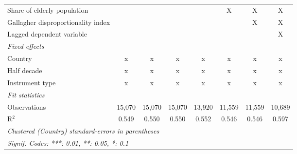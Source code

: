 \begin{tabular}{lccccccc}
   Share of elderly population                                        &                &               &               &               & X              & X              & X\\  
   Gallagher disproportionality index                                 &                &               &               &               &                & X              & X\\  
   Lagged dependent variable                                          &                &               &               &               &                &                & X\\  
   \emph{Fixed effects}\\
   Country                                                            & x              & x             & x             & x             & x              & x              & x\\  
   Half decade                                                        & x              & x             & x             & x             & x              & x              & x\\  
   Instrument type                                                    & x              & x             & x             & x             & x              & x              & x\\  
   \midrule \emph{Fit statistics}\\
   Observations                                                       & 15,070         & 15,070        & 15,070        & 13,920        & 11,559         & 11,559         & 10,689\\  
   R$^2$                                                              & 0.549          & 0.550         & 0.550         & 0.552         & 0.546          & 0.546          & 0.597\\  
   \midrule
   \multicolumn{8}{l}{\emph{Clustered (Country) standard-errors in parentheses}}\\
   \multicolumn{8}{l}{\emph{Signif. Codes: ***: 0.01, **: 0.05, *: 0.1}}\\
\end{tabular}
\par\endgroup


